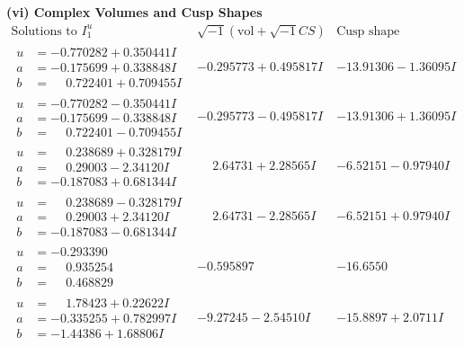 \documentclass[1p]{elsarticle_modified}
\theoremstyle{definition}
\newcommand{\I}{\sqrt{-1}}
\begin{document}
\newpage\flushleft \textbf{(vi) Complex Volumes and Cusp Shapes}
$$\begin{array}{c|c|c}  
\text{Solutions to }I^u_{1}& \I (\text{vol} + \sqrt{-1}CS) & \text{Cusp shape}\\
 \hline 
\begin{aligned}
u &= -0.770282 + 0.350441 I \\
a &= -0.175699 + 0.338848 I \\
b &= \phantom{-}0.722401 + 0.709455 I\end{aligned}
 & -0.295773 + 0.495817 I & -13.91306 - 1.36095 I \\ \hline\begin{aligned}
u &= -0.770282 - 0.350441 I \\
a &= -0.175699 - 0.338848 I \\
b &= \phantom{-}0.722401 - 0.709455 I\end{aligned}
 & -0.295773 - 0.495817 I & -13.91306 + 1.36095 I \\ \hline\begin{aligned}
u &= \phantom{-}0.238689 + 0.328179 I \\
a &= \phantom{-}0.29003 - 2.34120 I \\
b &= -0.187083 + 0.681344 I\end{aligned}
 & \phantom{-}2.64731 + 2.28565 I & -6.52151 - 0.97940 I \\ \hline\begin{aligned}
u &= \phantom{-}0.238689 - 0.328179 I \\
a &= \phantom{-}0.29003 + 2.34120 I \\
b &= -0.187083 - 0.681344 I\end{aligned}
 & \phantom{-}2.64731 - 2.28565 I & -6.52151 + 0.97940 I \\ \hline\begin{aligned}
u &= -0.293390\phantom{ +0.000000I} \\
a &= \phantom{-}0.935254\phantom{ +0.000000I} \\
b &= \phantom{-}0.468829\phantom{ +0.000000I}\end{aligned}
 & -0.595897\phantom{ +0.000000I} & -16.6550\phantom{ +0.000000I} \\ \hline\begin{aligned}
u &= \phantom{-}1.78423 + 0.22622 I \\
a &= -0.335255 + 0.782997 I \\
b &= -1.44386 + 1.68806 I\end{aligned}
 & -9.27245 - 2.54510 I & -15.8897 + 2.0711 I \\ \hline\begin{aligned}

\end{aligned}
\end{array}$$
\end{document}
